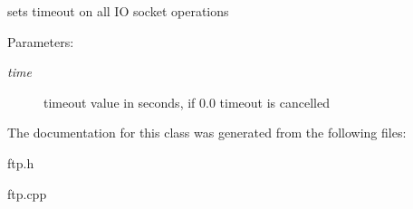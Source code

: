 sets timeout on all IO socket operations 

\begin{Desc}
\item[Parameters:]
\begin{description}
\item[{\em time}]timeout value in seconds, if 0.0 timeout is cancelled \end{description}
\end{Desc}


The documentation for this class was generated from the following files:\begin{CompactItemize}
\item 
ftp.h\item 
ftp.cpp\end{CompactItemize}
